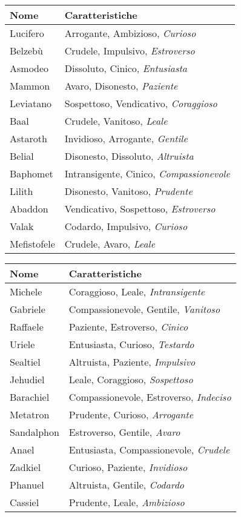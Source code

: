 \documentclass[a4paper,twoside,openany]{book}
\begin{document}
\begin{multicols}{2}
\noindent\begin{tabularx}{\linewidth}{lX}
	\toprule
	Nome & Caratteristiche \\
	\midrule
Lucifero  & Arrogante, Ambizioso, \textit{Curioso} \\
Belzebù   & Crudele, Impulsivo, \textit{Estroverso} \\
Asmodeo   & Dissoluto, Cinico, \textit{Entusiasta} \\
Mammon    & Avaro, Disonesto, \textit{Paziente} \\
Leviatano & Sospettoso, Vendicativo, \textit{Coraggioso} \\
Baal      & Crudele, Vanitoso, \textit{Leale} \\
Astaroth  & Invidioso, Arrogante, \textit{Gentile} \\
Belial    & Disonesto, Dissoluto, \textit{Altruista} \\
Baphomet  & Intransigente, Cinico, \textit{Compassionevole} \\
Lilith    & Disonesto, Vanitoso, \textit{Prudente} \\
Abaddon   & Vendicativo, Sospettoso, \textit{Estroverso} \\
Valak     & Codardo, Impulsivo, \textit{Curioso} \\
Mefistofele & Crudele, Avaro, \textit{Leale} \\
\bottomrule
\end{tabularx}


\noindent\begin{tabularx}{\linewidth}{lX}
	\toprule
	Nome & Caratteristiche \\
	\midrule
Michele   & Coraggioso, Leale, \textit{Intransigente} \\
Gabriele  & Compassionevole, Gentile, \textit{Vanitoso} \\
Raffaele  & Paziente, Estroverso, \textit{Cinico} \\
Uriele    & Entusiasta, Curioso, \textit{Testardo} \\
Sealtiel  & Altruista, Paziente, \textit{Impulsivo} \\
Jehudiel  & Leale, Coraggioso, \textit{Sospettoso} \\
Barachiel & Compassionevole, Estroverso, \textit{Indeciso} \\
Metatron  & Prudente, Curioso, \textit{Arrogante} \\
Sandalphon& Estroverso, Gentile, \textit{Avaro} \\
Anael     & Entusiasta, Compassionevole, \textit{Crudele} \\
Zadkiel   & Curioso, Paziente, \textit{Invidioso} \\
Phanuel   & Altruista, Gentile, \textit{Codardo} \\
Cassiel   & Prudente, Leale, \textit{Ambizioso} \\
\bottomrule
\end{tabularx}



\end{multicols}
\end{document}
